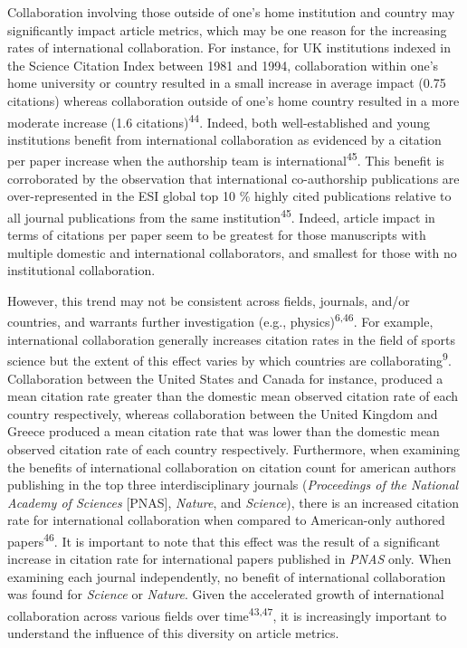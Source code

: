 \documentclass[
  man,floatsintext]{apa6}
\begin{document}
Collaboration involving those outside of one's home institution and country may significantly impact article metrics, which may be one reason for the increasing rates of international collaboration. For instance, for UK institutions indexed in the Science Citation Index between 1981 and 1994, collaboration within one's home university or country resulted in a small increase in average impact (0.75 citations) whereas collaboration outside of one's home country resulted in a more moderate increase (1.6 citations)\textsuperscript{44}. Indeed, both well-established and young institutions benefit from international collaboration as evidenced by a citation per paper increase when the authorship team is international\textsuperscript{45}. This benefit is corroborated by the observation that international co-authorship publications are over-represented in the ESI global top 10 \% highly cited publications relative to all journal publications from the same institution\textsuperscript{45}. Indeed, article impact in terms of citations per paper seem to be greatest for those manuscripts with multiple domestic and international collaborators, and smallest for those with no institutional collaboration.

However, this trend may not be consistent across fields, journals, and/or countries, and warrants further investigation (e.g., physics)\textsuperscript{6,46}. For example, international collaboration generally increases citation rates in the field of sports science but the extent of this effect varies by which countries are collaborating\textsuperscript{9}. Collaboration between the United States and Canada for instance, produced a mean citation rate greater than the domestic mean observed citation rate of each country respectively, whereas collaboration between the United Kingdom and Greece produced a mean citation rate that was lower than the domestic mean observed citation rate of each country respectively. Furthermore, when examining the benefits of international collaboration on citation count for american authors publishing in the top three interdisciplinary journals (\emph{Proceedings of the National Academy of Sciences} {[}PNAS{]}, \emph{Nature}, and \emph{Science}), there is an increased citation rate for international collaboration when compared to American-only authored papers\textsuperscript{46}. It is important to note that this effect was the result of a significant increase in citation rate for international papers published in \emph{PNAS} only. When examining each journal independently, no benefit of international collaboration was found for \emph{Science} or \emph{Nature}. Given the accelerated growth of international collaboration across various fields over time\textsuperscript{43,47}, it is increasingly important to understand the influence of this diversity on article metrics.
\end{document}
